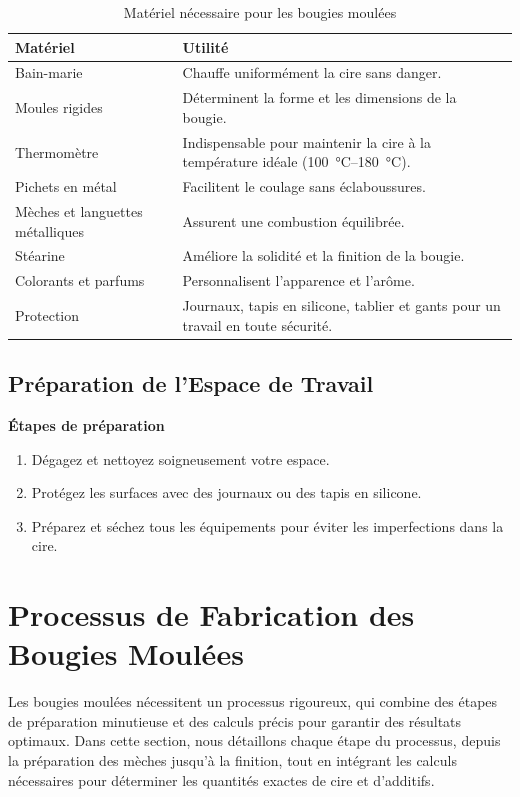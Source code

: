 \documentclass[11pt,fleqn,onecolumn,oneside]{book}
\begin{document}
\begin{table}[H]
\centering
\begin{tabular}{|p{4cm}|p{8cm}|}
\hline
\rowcolor{gray!20}\textbf{Matériel} & \textbf{Utilité} \\ \hline
Bain-marie & Chauffe uniformément la cire sans danger. \\ \hline
Moules rigides & Déterminent la forme et les dimensions de la bougie. \\ \hline
Thermomètre & Indispensable pour maintenir la cire à la température idéale (\SIrange{100}{180}{\degreeCelsius}). \\ \hline
Pichets en métal & Facilitent le coulage sans éclaboussures. \\ \hline
Mèches et languettes métalliques & Assurent une combustion équilibrée. \\ \hline
Stéarine & Améliore la solidité et la finition de la bougie. \\ \hline
Colorants et parfums & Personnalisent l’apparence et l’arôme. \\ \hline
Protection & Journaux, tapis en silicone, tablier et gants pour un travail en toute sécurité. \\ \hline
\end{tabular}
\caption{Matériel nécessaire pour les bougies moulées}
\end{table}

\subsection*{Préparation de l’Espace de Travail}


\begin{exercise}
\textbf{Étapes de préparation}
\begin{enumerate}
    \item Dégagez et nettoyez soigneusement votre espace.
    \item Protégez les surfaces avec des journaux ou des tapis en silicone.
    \item Préparez et séchez tous les équipements pour éviter les imperfections dans la cire.
\end{enumerate}
\end{exercise}

\section{Processus de Fabrication des Bougies Moulées}

Les bougies moulées nécessitent un processus rigoureux, qui combine des étapes de préparation minutieuse et des calculs précis pour garantir des résultats optimaux. Dans cette section, nous détaillons chaque étape du processus, depuis la préparation des mèches jusqu’à la finition, tout en intégrant les calculs nécessaires pour déterminer les quantités exactes de cire et d’additifs.
\end{document}
